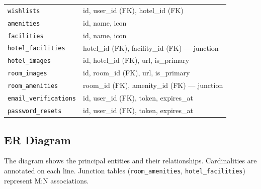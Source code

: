 \documentclass[12pt,a4paper]{article}
\begin{document}
\begin{table}[H]
\begin{tabularx}{\linewidth}{lX}
\texttt{wishlists}    & id, user\_id (FK), hotel\_id (FK) \\
\texttt{amenities}    & id, name, icon \\
\texttt{facilities}   & id, name, icon \\
\texttt{hotel\_facilities} & hotel\_id (FK), facility\_id (FK) --- junction \\
\texttt{hotel\_images}  & id, hotel\_id (FK), url, is\_primary \\
\texttt{room\_images}   & id, room\_id (FK), url, is\_primary \\
\texttt{room\_amenities} & room\_id (FK), amenity\_id (FK) --- junction \\
\texttt{email\_verifications} & id, user\_id (FK), token, expires\_at \\
\texttt{password\_resets} & id, user\_id (FK), token, expires\_at \\
\bottomrule
\end{tabularx}
\end{table}

\clearpage
\subsection{ER Diagram}

The diagram shows the principal entities and their relationships. Cardinalities are annotated on each line. Junction tables (\texttt{room\_amenities}, \texttt{hotel\_facilities}) represent M:N associations.
\end{document}
